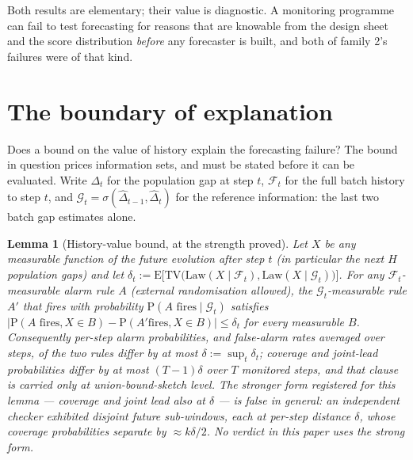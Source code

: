 \documentclass[11pt]{article}
\newtheorem{lemma}{Lemma}
\begin{document}
Both results are elementary; their value is diagnostic. A
monitoring programme can fail to test forecasting for reasons that
are knowable from the design sheet and the score distribution
\emph{before} any forecaster is built, and both of family 2's
failures were of that kind.

\section{The boundary of explanation}
\label{sec:boundary}

Does a bound on the value of history explain the forecasting
failure? The bound in question prices information sets, and must
be stated before it can be evaluated. Write $\Delta_t$ for the
population gap at step $t$, $\mathcal{F}_t$ for the full batch
history to step $t$, and $\mathcal{G}_t =
\sigma(\hat\Delta_{t-1}, \hat\Delta_t)$ for the reference
information: the last two batch gap estimates alone.

\begin{lemma}[History-value bound, at the strength proved]
\label{lem:history}
Let $X$ be any measurable function of the future evolution after
step $t$ (in particular the next $H$ population gaps) and let
$\delta_t := \mathrm{E}\bigl[\mathrm{TV}\bigl(\mathrm{Law}(X
\mid \mathcal{F}_t), \mathrm{Law}(X \mid
\mathcal{G}_t)\bigr)\bigr]$. For any $\mathcal{F}_t$-measurable
alarm rule $A$ (external randomisation allowed), the
$\mathcal{G}_t$-measurable rule $A'$ that fires with probability
$\mathrm{P}(A \text{ fires} \mid \mathcal{G}_t)$ satisfies
$|\mathrm{P}(A \text{ fires}, X \in B) - \mathrm{P}(A' \text{
fires}, X \in B)| \le \delta_t$ for every measurable $B$.
Consequently per-step alarm probabilities, and false-alarm rates
averaged over steps, of the two rules differ by at most $\delta
:= \sup_t \delta_t$; coverage and joint-lead probabilities differ
by at most $(T-1)\delta$ over $T$ monitored steps, and that
clause is carried only at union-bound-sketch level. The stronger
form registered for this lemma --- coverage and joint lead also
at $\delta$ --- is false in general: an independent checker
exhibited disjoint future sub-windows, each at per-step distance
$\delta$, whose coverage probabilities separate by $\approx
k\delta/2$. No verdict in this paper uses the strong form.
\end{lemma}
\end{document}

